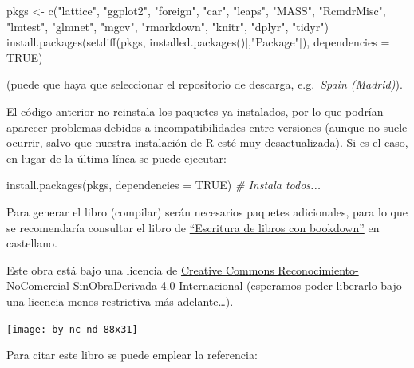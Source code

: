 \documentclass[
]{book}
\newenvironment{Shaded}{\begin{snugshade}}{\end{snugshade}}
\newcommand{\AttributeTok}[1]{\textcolor[rgb]{0.77,0.63,0.00}{#1}}
\newcommand{\CommentTok}[1]{\textcolor[rgb]{0.56,0.35,0.01}{\textit{#1}}}
\newcommand{\ConstantTok}[1]{\textcolor[rgb]{0.00,0.00,0.00}{#1}}
\newcommand{\FunctionTok}[1]{\textcolor[rgb]{0.00,0.00,0.00}{#1}}
\newcommand{\NormalTok}[1]{#1}
\newcommand{\OtherTok}[1]{\textcolor[rgb]{0.56,0.35,0.01}{#1}}
\newcommand{\StringTok}[1]{\textcolor[rgb]{0.31,0.60,0.02}{#1}}
\theoremstyle{break}
\theoremstyle{nonumberplain}
\begin{document}
\begin{Shaded}
\begin{Highlighting}[]
\NormalTok{pkgs }\OtherTok{\textless{}{-}} \FunctionTok{c}\NormalTok{(}\StringTok{"lattice"}\NormalTok{, }\StringTok{"ggplot2"}\NormalTok{, }\StringTok{"foreign"}\NormalTok{, }\StringTok{"car"}\NormalTok{, }\StringTok{"leaps"}\NormalTok{, }\StringTok{"MASS"}\NormalTok{, }\StringTok{"RcmdrMisc"}\NormalTok{, }
          \StringTok{"lmtest"}\NormalTok{, }\StringTok{"glmnet"}\NormalTok{, }\StringTok{"mgcv"}\NormalTok{, }\StringTok{"rmarkdown"}\NormalTok{, }\StringTok{"knitr"}\NormalTok{, }\StringTok{"dplyr"}\NormalTok{, }\StringTok{"tidyr"}\NormalTok{)}
\FunctionTok{install.packages}\NormalTok{(}\FunctionTok{setdiff}\NormalTok{(pkgs, }\FunctionTok{installed.packages}\NormalTok{()[,}\StringTok{"Package"}\NormalTok{]), }\AttributeTok{dependencies =} \ConstantTok{TRUE}\NormalTok{)}
\end{Highlighting}
\end{Shaded}

(puede que haya que seleccionar el repositorio de descarga, e.g.~\emph{Spain (Madrid)}).

El código anterior no reinstala los paquetes ya instalados, por lo que podrían aparecer problemas debidos a incompatibilidades entre versiones (aunque no suele ocurrir, salvo que nuestra instalación de R esté muy desactualizada).
Si es el caso, en lugar de la última línea se puede ejecutar:

\begin{Shaded}
\begin{Highlighting}[]
\FunctionTok{install.packages}\NormalTok{(pkgs, }\AttributeTok{dependencies =} \ConstantTok{TRUE}\NormalTok{) }\CommentTok{\# Instala todos...}
\end{Highlighting}
\end{Shaded}

Para generar el libro (compilar) serán necesarios paquetes adicionales,
para lo que se recomendaría consultar el libro de \href{https://rubenfcasal.github.io/bookdown_intro}{``Escritura de libros con bookdown''} en castellano.

Este obra está bajo una licencia de \href{https://creativecommons.org/licenses/by-nc-nd/4.0/deed.es_ES}{Creative Commons Reconocimiento-NoComercial-SinObraDerivada 4.0 Internacional}
(esperamos poder liberarlo bajo una licencia menos restrictiva más adelante\ldots).

\texttt{[image: by-nc-nd-88x31]}

Para citar este libro se puede emplear la referencia:
\end{document}
